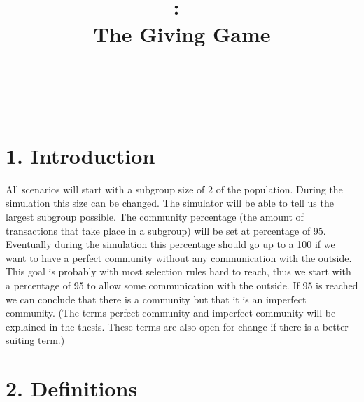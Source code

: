 \documentclass{article}
\title{
\vspace{2in}
\textmd{\textbf{\hmwkClass:\ \hmwkTitle}}\\
\textmd{The Giving Game}\\
\normalsize\vspace{0.1in}\small{\hmwkDueDate}\\
\vspace{0.1in}\large{\textit{\hmwkClassInstructor\ \hmwkClassTime}}
\vspace{3in}
}
\author{\textbf{\hmwkAuthorName}}
\date{} %
\begin{document}
\maketitle



\newpage
\tableofcontents
\newpage



\section{1. Introduction}
All scenarios will start with a subgroup size of 2 of the population. During the simulation this size can be changed. The simulator will be able to tell us the largest subgroup possible. The community percentage (the amount of transactions that take place in a subgroup) will be set at percentage of 95. Eventually during the simulation this percentage should go up to a 100 if we want to have a perfect community without any communication with the outside. This goal is probably with most selection rules hard to reach, thus we start with a percentage of 95 to allow some communication with the outside. If 95 is reached we can conclude that there is a community but that it is an imperfect community. (The terms perfect community and imperfect community will be  explained in the thesis. These terms are also open for change if there is a better suiting term.)

\section{2. Definitions}
\end{document}
